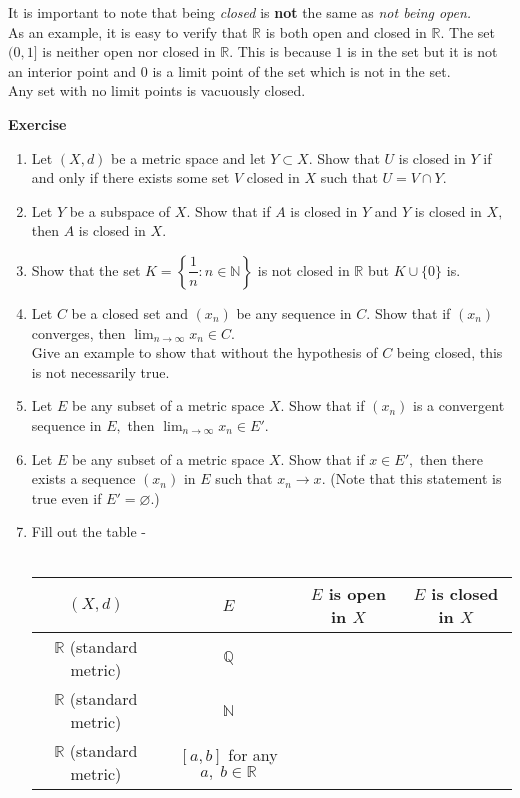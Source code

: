 \documentclass{article}
\let\emptyset\varnothing
\newcounter{exercise}
\newcommand{\exercise}{\refstepcounter{exercise}\par\medskip
   {\textbf{Exercise \theexercise }} \rmfamily}
\begin{document}
	It is important to note that being \emph{closed} is \textbf{not} the same as \emph{not being open.}\\
	As an example, it is easy to verify that $\mathbb{R}$ is both open and closed in $\mathbb{R}.$ The set $(0, 1]$ is neither open nor closed in $\mathbb{R}.$ This is because $1$ is in the set but it is not an interior point and $0$ is a limit point of the set which is not in the set.\\
	Any set with no limit points is vacuously closed.\\
	\exercise
	\begin{enumerate}[nosep] 
		\item Let $(X, d)$ be a metric space and let $Y \subset X.$ Show that $U$ is closed in $Y$ if and only if there exists some set $V$ closed in $X$ such that $U = V \cap Y.$
		\item Let $Y$ be a subspace of $X.$ Show that if $A$ is closed in $Y$ and $Y$ is closed in $X,$ then $A$ is closed in $X.$
		\item Show that the set $K = \left\{\dfrac{1}{n} : n \in \mathbb{N}\right\}$ is not closed in $\mathbb{R}$ but $K \cup \{0\}$ is.
		\item Let $C$ be a closed set and $(x_n)$ be any sequence in $C.$ Show that if $(x_n)$ converges, then $\displaystyle\lim_{n\to \infty}x_n \in C.$\\
		Give an example to show that without the hypothesis of $C$ being closed, this is not necessarily true.
		\item Let $E$ be any subset of a metric space $X.$ Show that if $(x_n)$ is a convergent sequence in $E,$ then $\displaystyle\lim_{n\to \infty}x_n \in E'.$
		\item Let $E$ be any subset of a metric space $X.$ Show that if $x \in E',$ then there exists a sequence $(x_n)$ in $E$ such that $x_n \to x.$ (Note that this statement is true even if $E' = \emptyset.$)
		\item Fill out the table - \\~\\
		\begin{tabular}{|c|c|c|c|}
			\hline
			$(X, d)$ & $E$ & $E$ is open in $X$ & $E$ is closed in $X$\\
			\hline
			$\mathbb{R}$ (standard metric) & $\mathbb{Q}$ & & \\
			$\mathbb{R}$ (standard metric) & $\mathbb{N}$ & & \\
			$\mathbb{R}$ (standard metric) & $[a, b]$ for any $a,\;b \in \mathbb{R}$ & & \\

\end{tabular}
\end{enumerate}
\end{document}
